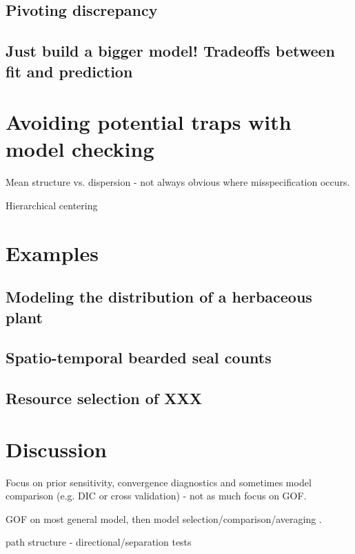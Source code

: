 \documentclass[12pt,english]{article}
\begin{document}
\begin{spacing}{1.9}
\subsection{Pivoting discrepancy}

\citet{YuanJohnson2012}

\subsection{Just build a bigger model!  Tradeoffs between fit and prediction}

\section{Avoiding potential traps with model checking}

Mean structure vs. dispersion - not always obvious where misspecification occurs.

Hierarchical centering

\section{Examples}

\subsection{Modeling the distribution of a herbaceous plant}

\subsection{Spatio-temporal bearded seal counts}

\subsection{Resource selection of XXX}

\section{Discussion}


Focus on prior sensitivity, convergence diagnostics and sometimes model comparison (e.g. DIC or cross validation) - not as much focus on GOF.

GOF on most general model, then model selection/comparison/averaging \citep{BurnhamAnderson2004}.

path structure - directional/separation tests


\end{spacing}
\end{document}
